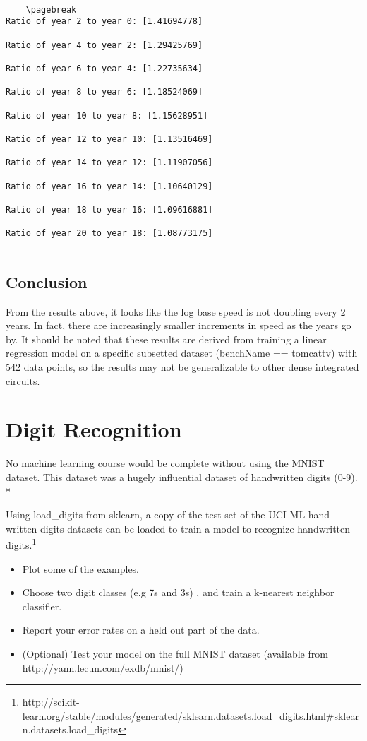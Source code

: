 \documentclass[11pt]{article}
\def\br{\hspace*{\fill} \\* }
\begin{document}
    \begin{Verbatim}[commandchars=\\\{\},fontsize=\footnotesize]
    
    \pagebreak
Ratio of year 2 to year 0: [1.41694778]

Ratio of year 4 to year 2: [1.29425769]

Ratio of year 6 to year 4: [1.22735634]

Ratio of year 8 to year 6: [1.18524069]

Ratio of year 10 to year 8: [1.15628951]

Ratio of year 12 to year 10: [1.13516469]

Ratio of year 14 to year 12: [1.11907056]

Ratio of year 16 to year 14: [1.10640129]

Ratio of year 18 to year 16: [1.09616881]

Ratio of year 20 to year 18: [1.08773175]


    \end{Verbatim}

   \subsection*{Conclusion}

From the results above, it looks like the log base speed is not doubling
every 2 years. In fact, there are increasingly smaller increments in
speed as the years go by. It should be noted that these results are
derived from training a linear regression model on a specific subsetted
dataset (benchName == tomcattv) with 542 data points, so the results may
not be generalizable to other dense integrated circuits.
\pagebreak
    \section{Digit Recognition}

No machine learning course would be complete without using the MNIST
dataset. This dataset was a hugely influential dataset of handwritten
digits (0-9).\br

Using load\_digits from sklearn, a copy of the test set of the UCI ML
hand-written digits datasets can be loaded to train a model to recognize
handwritten digits.\footnote{http://scikit-learn.org/stable/modules/generated/sklearn.datasets.load\_digits.html\#sklearn.datasets.load\_digits}

\begin{itemize}
\item
  Plot some of the examples.
\item
  Choose two digit classes (e.g 7s and 3s) , and train a k-nearest
  neighbor classifier.
\item
  Report your error rates on a held out part of the data.
\item
  (Optional) Test your model on the full MNIST dataset (available from
  http://yann.lecun.com/exdb/mnist/)
\end{itemize}
\end{document}

